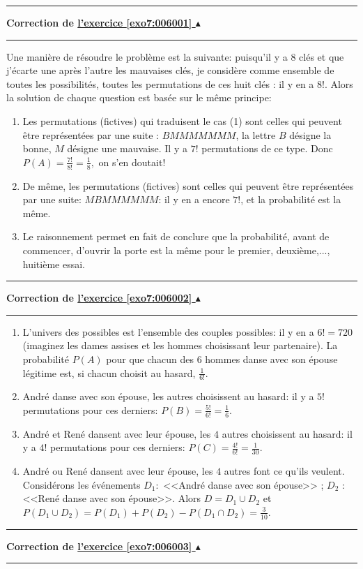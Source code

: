 \documentclass[11pt,a4paper]{article}
\newcounter{exo}
\newcommand{\correction}[1]{\hypertarget{cor7:#1}{}\label{cor7:#1}{\bf Correction de \hyperlink{exo7:#1}{l'exercice \ref{exo7:#1} $\blacktriangle$}}\vspace{1mm}\hrule\vspace{1mm}}
\newcommand{\fincorrection}{\vspace{1mm}\hrule\vspace*{7mm}}
\begin{document}
\fincorrection
\correction{006001}
Une manière de résoudre le problème est la suivante:
puisqu'il y a $8$ clés et que j'écarte une après l'autre les mauvaises clés, 
je considère comme ensemble de toutes les possibilités, toutes les permutations de ces huit clés : 
il y en a $8$!. Alors la solution de chaque question est basée sur le même principe:
\begin{enumerate}
\item Les permutations (fictives) qui traduisent le cas (1) sont celles qui
peuvent être représentées par une suite : 
$BMMMMMMM$, la lettre $B$ désigne la bonne, $M$ désigne une
mauvaise. Il y a $7!$ permutations de ce type.
Donc $P(A)=\frac{7!}{8!}=\frac{1}{8},$ on s'en doutait!
\item De même, les permutations (fictives) sont
celles qui peuvent être représentées par une suite:
$MBMMMMMM$: il y en a encore $7$!, et la probabilité est la même.
\item Le raisonnement permet en fait de conclure que la probabilité, avant
de commencer, d'ouvrir la porte est la même pour le premier, deuxième,..., huitième essai.
\end{enumerate}
\fincorrection
\correction{006002}
\begin{enumerate}
\item L'univers des possibles est l'ensemble des couples possibles:
il y en a $6!=720$ (imaginez les dames assises et les hommes choisissant
leur partenaire). La probabilité $P(A)$ pour que chacun des $6$ hommes
danse avec son épouse légitime est, si chacun choisit au hasard, $\frac{1}{6!}$.

\item André danse avec son épouse, les autres choisissent au hasard: il y
a $5!$ permutations pour ces derniers:
$P(B)=\frac{5!}{6!}=\frac{1}{6}$.

\item André et René dansent avec leur épouse, les $4$ autres
choisissent au hasard: il y a $4!$ permutations pour ces derniers:
$P(C)=\frac{4!}{6!}=\frac{1}{30}$.

\item André ou René dansent avec leur épouse, les $4$ autres font ce
qu'ils veulent. Considérons les événements $D_{1}:$ <<André
danse avec son épouse>> ; $D_{2}$ : <<René danse avec son épouse>>. 
Alors $D=D_{1}\cup D_{2}$ et
 $P(D_{1}\cup D_{2})=P(D_{1})+P(D_{2})-P(D_{1}\cap D_{2})=\frac{3}{10}$.
\end{enumerate}
\fincorrection
\correction{006003}
\end{document}
